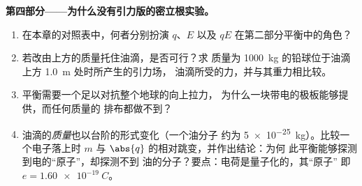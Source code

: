 \begin{problem}
\medskip
\noindent\textbf{第四部分——为什么没有引力版的密立根实验。}
\begin{enumerate}[resume]
  \item 在本章的对照表中，何者分别扮演 $q$、$E$
        以及 $qE$ 在第二部分平衡中的角色？
  \item 若改由上方的质量托住油滴，是否可行？求
        质量为 \qty{1000}{kg} 的铅球位于油滴上方 \qty{1.0}{m} 处时所产生的引力场，
        油滴所受的力，并与其重力相比较。
  \item 平衡需要一个足以对抗整个地球的向上拉力，
        为什么一块带电的极板能够提供，而任何质量的
        排布都做不到？
  \item 油滴的\emph{质量}也以台阶的形式变化（一个油分子
        约为 \qty{5e-25}{kg}）。比较一个电子落上时
        $m$ 与 $\abs{q}$ 的相对跳变，并作出结论：为何
        此平衡能够探测到电的“原子”，却探测不到
        油的分子？要点：电荷是量子化的，其“原子”
        即 $e = \qty{1.60e-19}{C}$。
\end{enumerate}
\end{problem}
